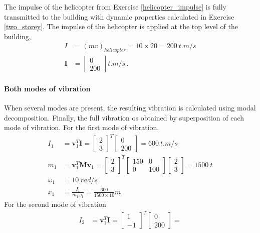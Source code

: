 \begin{Answer}[ref={two_storey_helicopter}]
The impulse of the helicopter from Exercise \ref{helicopter_impulse} is fully transmitted to the building with dynamic properties calculated in Exercise \ref{two_storey}. The impulse of the helicopter is applied at the top level of the building,
\begin{align*}
I &= (mv)_{helicopter} = 10 \times 20 = \SI{200}{t.m/s} \\
\mathbf{I} &= \begin{bmatrix}0 \\ 200\end{bmatrix} \si{t.m/s}\,.
\end{align*}

\paragraph{Both modes of vibration}
When several modes are present, the resulting vibration is calculated using modal decomposition. Finally, the full vibration os obtained by superposition of each mode of vibration. For the first mode of vibration,
\begin{align*}
    I_1 &= \mathbf{v}_1^T\mathbf{I} =
    \begin{bmatrix}2 \\ 3\end{bmatrix}^T \begin{bmatrix}0 \\ 200\end{bmatrix} =
    \SI{600}{t.m/s} \\
    m_1 &= \mathbf{v}_1^T\mathbf{M}\mathbf{v}_1 =
    \begin{bmatrix}2 \\ 3\end{bmatrix}^T \begin{bmatrix}150 & 0 \\ 0 & 100\end{bmatrix} \begin{bmatrix}2 \\ 3\end{bmatrix} =
    \SI{1500}{t} \\
    \omega_1 &= \SI{10}{rad/s} \\
    x_1 &= \frac{I_1}{m_1\omega_1} = \frac{600}{1500\times10} \si{m}\,.
\end{align*}
For the second mode of vibration
\begin{align*}
    I_2 &= \mathbf{v}_1^T\mathbf{I} =
    \begin{bmatrix}1 \\ -1\end{bmatrix}^T \begin{bmatrix}0 \\ 200\end{bmatrix} =

\end{align*}
\end{Answer}
